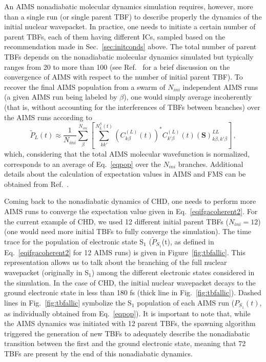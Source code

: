 \documentclass[9pt,bestpractices]{livecoms}
\newcommand{\bs}{\mathbf}
\begin{document}
An AIMS nonadiabatic molecular dynamics simulation requires, however, more than a single run (or single parent TBF) to describe properly the dynamics of the initial nuclear wavepacket. In practice, one needs to initiate a certain number of parent TBFs, each of them having different ICs, sampled based on the recommendation made in Sec.~\ref{sec:initconds} above. The total number of parent TBFs depends on the nonadiabatic molecular dynamics simulated but typically ranges from 20 to more than 100 (see Ref.~ for a brief discussion on the convergence of AIMS with respect to the number of initial parent TBF). To recover the final AIMS population from a swarm of $N_{ini}$ independent AIMS runs (a given AIMS run being labeled by $\beta$), one would simply average incoherently (that is, without accounting for the interferences of TBFs between branches) over the AIMS runs according to
\begin{equation}
\tilde{P}_L(t) \approx \frac{1}{N_{ini}} \sum_{\beta}^{N_{ini}} \left[   \sum_{kk'}^{N_L^\beta(t)} \left(C_{k\beta}^{(L)}(t)\right)^\ast C_{k'\beta}^{(L)}(t)  (\bs S)^{LL}_{k\beta,k'\beta} \right] \, ,
\label{eqifgacoherent2}
\end{equation}
which, considering that the total AIMS molecular wavefunction is normalized, corresponds to an average of Eq.~\eqref{eqpop} over the $N_{ini}$ branches.
Additional details about the calculation of expectation values in AIMS and FMS can be obtained from Ref.~.

Coming back to the nonadiabatic dynamics of CHD, one needs to perform more AIMS runs to converge the expectation value given in Eq.~\eqref{eqifgacoherent2}. For the current example of CHD, we used 12 different initial parent TBFs ($N_{ini}=12$) (one would need more initial TBFs to fully converge the simulation). The time trace for the population of electronic state S$_1$ ($\tilde{P}_{S_1}$(t), as defined in Eq.~\eqref{eqifgacoherent2} for 12 AIMS runs) is given in Figure~\ref{fig:tbfallic}. This representation allows us to talk about the branching of the full nuclear wavepacket (originally in S$_1$) among the different electronic states considered in the simulation. In the case of CHD, the initial nuclear wavepacket decays to the ground electronic state in less than 180 fs (thick line in Fig.~\ref{fig:tbfallic}). Dashed lines in Fig.~\ref{fig:tbfallic} symbolize the S$_1$ population of each AIMS run ($P_{S_1}(t)$, as individually obtained from Eq.~\eqref{eqpop}). It is important to note that, while the AIMS dynamics was initiated with 12 parent TBFs, the spawning algorithm triggered the generation of new TBFs to adequately describe the nonadiabatic transition between the first and the ground electronic state, meaning that 72 TBFs are present by the end of this nonadiabatic dynamics. 
\end{document}
